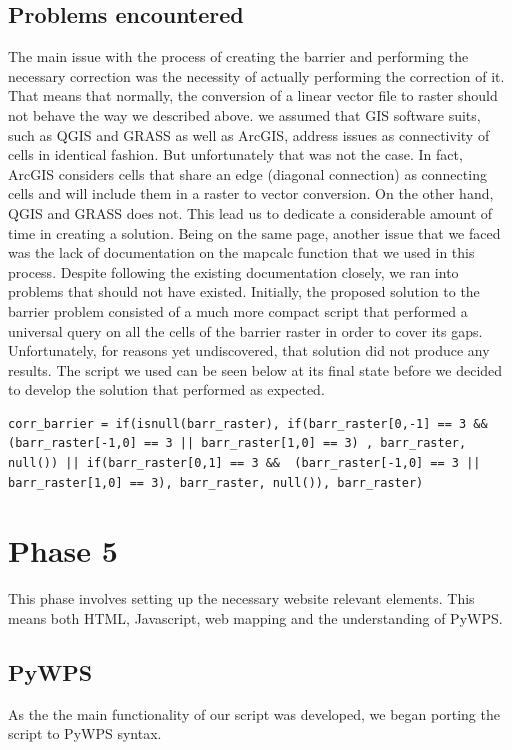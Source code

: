 \subsection{Problems encountered}
The main issue with the process of creating the barrier and performing the necessary correction was the necessity of actually performing the correction of it. That means that normally, the conversion of a linear vector file to raster should not behave the way we described above. we assumed that GIS software suits, such as QGIS and GRASS as well as ArcGIS, address issues as connectivity of cells in identical fashion. But unfortunately that was not the case. In fact, ArcGIS considers cells that share an edge (diagonal connection) as connecting cells and will include them in a raster to vector conversion. On the other hand, QGIS and GRASS does not. This lead us to dedicate a considerable amount of time in creating a solution.
Being on the same page, another issue that we faced was the lack of documentation on the mapcalc function that we used in this process. Despite following the existing documentation closely, we ran into problems that should not have existed. Initially, the proposed solution to the barrier problem consisted of a much more compact script that performed a universal query on all the cells of the barrier raster in order to cover its gaps. Unfortunately, for reasons yet undiscovered, that solution did not produce any results. The script we used can be seen below at its final state before we decided to develop the solution that performed as expected.

\begin{lstlisting}
corr_barrier = if(isnull(barr_raster), if(barr_raster[0,-1] == 3 && (barr_raster[-1,0] == 3 || barr_raster[1,0] == 3) , barr_raster, null()) || if(barr_raster[0,1] == 3 &&  (barr_raster[-1,0] == 3 || barr_raster[1,0] == 3), barr_raster, null()), barr_raster)
\end{lstlisting}

\section{Phase 5}
This phase involves setting up the necessary website relevant elements. This means both HTML, Javascript, web mapping and the understanding of PyWPS.\\

\subsection{PyWPS}
As the the main functionality of our script was developed, we began porting the script to PyWPS syntax. 

